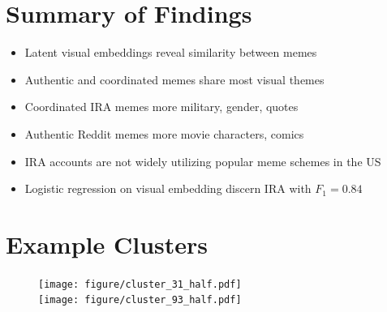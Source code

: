 \documentclass[article,36pt,extrafontsizes,oneside,openany,oldfontcommands]{memoir}
\begin{document}
\begin{adjmulticols*}{3}{0.5in}{0.5in}
\section{Summary of Findings}
\begin{adjustwidth}{0.1in}{0in}
\begin{itemize}[topsep=0pt,itemsep=0ex,partopsep=0ex,parsep=0ex]
\item Latent visual embeddings reveal similarity between memes
\item Authentic and coordinated memes share most visual themes
\item Coordinated IRA memes more military, gender, quotes
\item Authentic Reddit memes more movie characters, comics
\item IRA accounts are not widely utilizing popular meme schemes in the US
\item Logistic regression on visual embedding discern IRA with $F_1=0.84$
\end{itemize} 
\end{adjustwidth}


\section{Example Clusters}
\begin{adjustwidth}{0.1in}{0in}
\begin{figure}
    \texttt{[image: figure/cluster\_31\_half.pdf]}
    \\[1cm]
    \texttt{[image: figure/cluster\_93\_half.pdf]}
\end{figure}
\vspace{-3cm}
\end{adjustwidth}

\columnbreak


\end{adjmulticols*}
\end{document}

